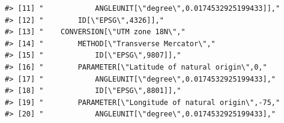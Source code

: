 \documentclass[
]{book}
\begin{document}
\begin{verbatim}
#> [11] "            ANGLEUNIT[\"degree\",0.0174532925199433]],"                                                                                                                                                                                                                         
#> [12] "        ID[\"EPSG\",4326]],"                                                                                                                                                                                                                                                    
#> [13] "    CONVERSION[\"UTM zone 18N\","                                                                                                                                                                                                                                               
#> [14] "        METHOD[\"Transverse Mercator\","                                                                                                                                                                                                                                        
#> [15] "            ID[\"EPSG\",9807]],"                                                                                                                                                                                                                                                
#> [16] "        PARAMETER[\"Latitude of natural origin\",0,"                                                                                                                                                                                                                            
#> [17] "            ANGLEUNIT[\"degree\",0.0174532925199433],"                                                                                                                                                                                                                          
#> [18] "            ID[\"EPSG\",8801]],"                                                                                                                                                                                                                                                
#> [19] "        PARAMETER[\"Longitude of natural origin\",-75,"                                                                                                                                                                                                                         
#> [20] "            ANGLEUNIT[\"degree\",0.0174532925199433],"                                                                                                                                                                                                                          

\end{verbatim}
\end{document}
